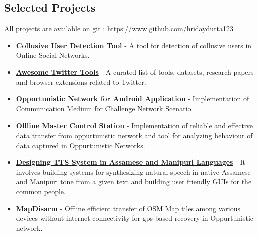 \documentclass[margin, centered]{res}
\begin{document}
\begin{resume}
\section{Selected Projects}
All projects are available on git : \url{https://www.github.com/hridaydutta123}
\begin{itemize}[leftmargin=*]
 \item \textbf{\href{https://github.com/hridaydutta123/collusive-user-detection-tool}{Collusive User Detection Tool}} - A tool for detection of collusive users in Online Social Networks.
 \item \textbf{\href{https://github.com/hridaydutta123/awesome-twitter-tools}{Awesome Twitter Tools}} - A curated list of tools, datasets, research papers and browser extensions related to Twitter.

 \item \textbf{\href{https://github.com/ItsForkIT/pdm}{Opportunistic Network for Android Application}} - Implementation of Communication Medium for Challenge Network Scenario. 
 \newpage
 \item \textbf{\href{http://www.github.com/hridaydutta123/offlinemcs}{Offline Master Control Station}} - Implementation of reliable and effective data transfer from oppurtunistic network and tool for analyzing behaviour of data captured in Oppurtunistic Networks.
 \item \textbf{\href{http://www.iitg.ernet.in/cseweb/tts/tts/Assamese/}{Designing TTS System in Assamese and Manipuri Languages}} - It involves building systems for synthesizing natural speech in native Assamese and Manipuri tone from a given text and building user friendly GUIs for the common people.

 \item \textbf{\href{https://github.com/hridaydutta123/MapDisarm}{MapDisarm}} - Offline efficient transfer of OSM Map tiles among various devices without internet connectivity for gps based recovery in Oppurtunistic network.
\end{itemize}


\end{resume}
\end{document}

